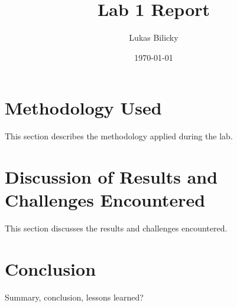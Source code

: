 \documentclass[a4paper,12pt]{article}
\title{Lab 1 Report}
\author{Lukas Bilicky}
\date{\today}
\begin{document}
\maketitle

\section{Methodology Used}
This section describes the methodology applied during the lab.

\section{Discussion of Results and Challenges Encountered}
This section discusses the results and challenges encountered.

\section{Conclusion}
Summary, conclusion, lessons learned?
\end{document}
